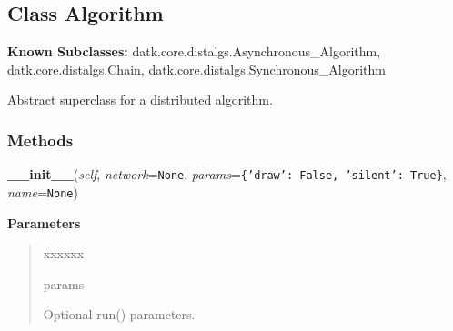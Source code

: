 
\subsection{Class Algorithm}

    \label{datk:core:distalgs:Algorithm}
\textbf{Known Subclasses:}
datk.core.distalgs.Asynchronous\_Algorithm,
    datk.core.distalgs.Chain,
    datk.core.distalgs.Synchronous\_Algorithm

Abstract superclass for a distributed algorithm.



  \subsubsection{Methods}

    \label{datk:core:distalgs:Algorithm:__init__}

    \vspace{0.5ex}

\hspace{.8\funcindent}\begin{boxedminipage}{\funcwidth}

    \raggedright \textbf{\_\_init\_\_}(\textit{self}, \textit{network}={\tt None}, \textit{params}={\tt \texttt{\{}\texttt{'}\texttt{draw}\texttt{'}\texttt{: }False\texttt{, }\texttt{'}\texttt{silent}\texttt{'}\texttt{: }True\texttt{\}}}, \textit{name}={\tt None})

\setlength{\parskip}{2ex}
\setlength{\parskip}{1ex}
      \textbf{Parameters}
      \vspace{-1ex}

      \begin{quote}
        \begin{Ventry}{xxxxxx}

          \item[params]

          Optional run() parameters.

        \end{Ventry}

      \end{quote}

    \end{boxedminipage}

